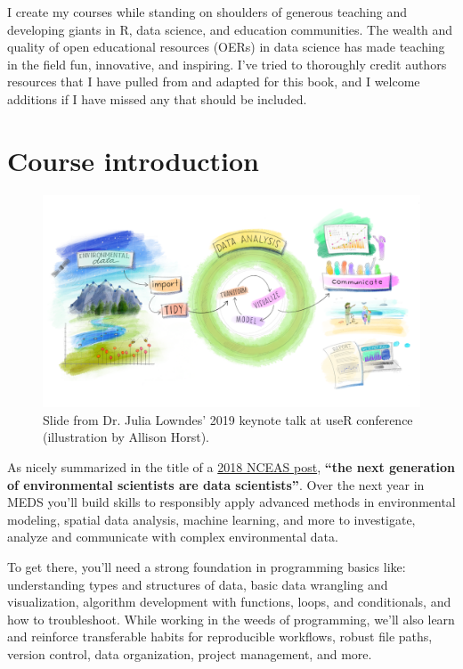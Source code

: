 \documentclass[
]{book}
\begin{document}
I create my courses while standing on shoulders of generous teaching and developing giants in R, data science, and education communities. The wealth and quality of open educational resources (OERs) in data science has made teaching in the field fun, innovative, and inspiring. I've tried to thoroughly credit authors resources that I have pulled from and adapted for this book, and I welcome additions if I have missed any that should be included.

\hypertarget{course-introduction}{%
\section{Course introduction}\label{course-introduction}}

\begin{figure}

{\centering \includegraphics[width=1\linewidth]{images/eds_r4ds} 

}

\caption{Slide from Dr. Julia Lowndes' 2019 keynote talk at useR conference (illustration by Allison Horst).}\label{fig:unnamed-chunk-1}
\end{figure}

As nicely summarized in the title of a \href{https://www.nceas.ucsb.edu/news/next-generation-environmental-scientists-are-data-scientists}{2018 NCEAS post}, \textbf{``the next generation of environmental scientists are data scientists''}. Over the next year in MEDS you'll build skills to responsibly apply advanced methods in environmental modeling, spatial data analysis, machine learning, and more to investigate, analyze and communicate with complex environmental data.

To get there, you'll need a strong foundation in programming basics like: understanding types and structures of data, basic data wrangling and visualization, algorithm development with functions, loops, and conditionals, and how to troubleshoot. While working in the weeds of programming, we'll also learn and reinforce transferable habits for reproducible workflows, robust file paths, version control, data organization, project management, and more.
\end{document}
